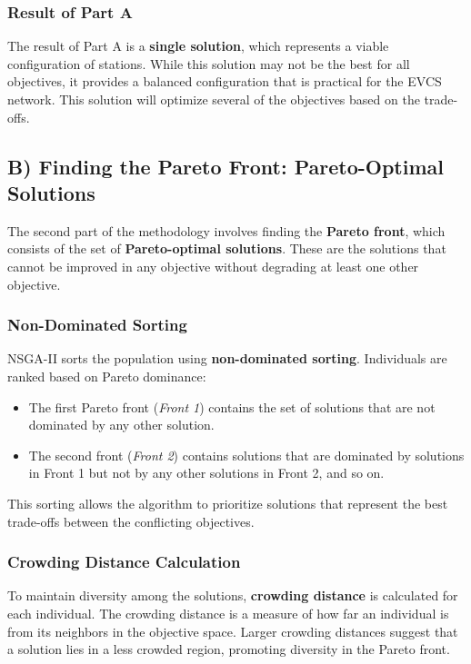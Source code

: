 \subsubsection{Result of Part A}
The result of Part A is a \textbf{single solution}, which represents a viable configuration of stations. While this solution may not be the best for all objectives, it provides a balanced configuration that is practical for the EVCS network. This solution will optimize several of the objectives based on the trade-offs.

\subsection{B) Finding the Pareto Front: Pareto-Optimal Solutions}

The second part of the methodology involves finding the \textbf{Pareto front}, which consists of the set of \textbf{Pareto-optimal solutions}. These are the solutions that cannot be improved in any objective without degrading at least one other objective. 

\subsubsection{Non-Dominated Sorting}
NSGA-II sorts the population using \textbf{non-dominated sorting}. Individuals are ranked based on Pareto dominance:
\begin{itemize}
    \item The first Pareto front (\textit{Front 1}) contains the set of solutions that are not dominated by any other solution.
    \item The second front (\textit{Front 2}) contains solutions that are dominated by solutions in Front 1 but not by any other solutions in Front 2, and so on.
\end{itemize}

This sorting allows the algorithm to prioritize solutions that represent the best trade-offs between the conflicting objectives.

\subsubsection{Crowding Distance Calculation}
To maintain diversity among the solutions, \textbf{crowding distance} is calculated for each individual. The crowding distance is a measure of how far an individual is from its neighbors in the objective space. Larger crowding distances suggest that a solution lies in a less crowded region, promoting diversity in the Pareto front.

